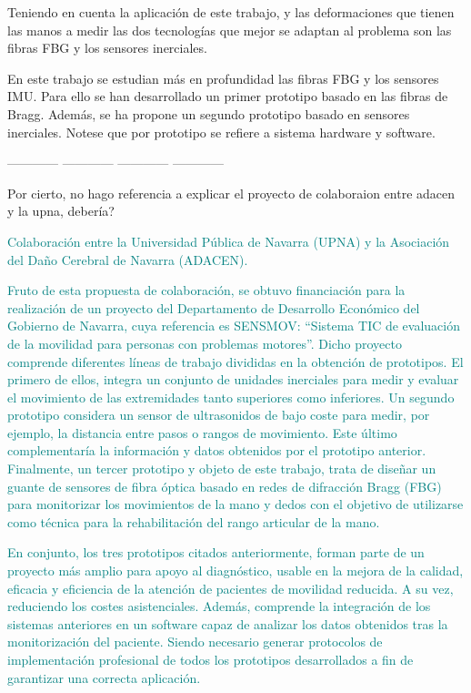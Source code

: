 Teniendo en cuenta la aplicación de este trabajo, y las deformaciones que tienen las manos a medir las dos tecnologías que mejor se adaptan al problema son las fibras FBG y los sensores inerciales.

En este trabajo se estudian más en profundidad las fibras FBG y los sensores IMU. Para ello se han desarrollado un primer prototipo basado en las fibras de Bragg. Además, se ha propone un segundo prototipo basado en sensores inerciales. Notese que por prototipo se refiere a sistema hardware y software.

------------ ------------ ------------ ------------

\textcolor{rositaoscuro}{Por cierto, no hago referencia a explicar el proyecto de colaboraion entre adacen y la upna, debería?}

\textcolor{teal}{
Colaboración entre la Universidad Pública de Navarra (UPNA) y la Asociación del Daño Cerebral de Navarra	(ADACEN). 
}

\textcolor{teal}{
Fruto de esta propuesta de colaboración, se obtuvo financiación para la realización de un proyecto del Departamento de Desarrollo Económico del Gobierno de Navarra, cuya referencia es SENSMOV: “Sistema TIC de evaluación de la movilidad para personas con problemas motores”. Dicho proyecto comprende diferentes líneas de trabajo divididas en la obtención de prototipos. El primero de ellos, integra un conjunto de unidades inerciales para medir y evaluar el movimiento de las extremidades tanto superiores como inferiores. Un segundo prototipo considera un sensor de ultrasonidos de bajo coste para medir, por ejemplo, la distancia entre pasos o rangos de movimiento. Este último complementaría la información y datos obtenidos por el prototipo anterior. Finalmente, un tercer prototipo y objeto de este trabajo, trata de diseñar un guante de sensores de fibra óptica basado en redes de difracción Bragg (FBG) para monitorizar los movimientos de la mano y dedos con el objetivo de utilizarse como técnica para la rehabilitación del rango articular de la mano.
}

\textcolor{teal}{
En conjunto, los tres prototipos citados anteriormente, forman parte de un proyecto más amplio para apoyo al diagnóstico, usable en la mejora de la calidad, eficacia y eficiencia de la atención de pacientes de movilidad reducida. A su vez, reduciendo los costes asistenciales. Además, comprende la integración de los sistemas anteriores en un software capaz de analizar los datos obtenidos tras la monitorización del paciente. Siendo necesario generar protocolos de implementación profesional de todos los prototipos desarrollados a fin de garantizar una correcta aplicación.
}

 